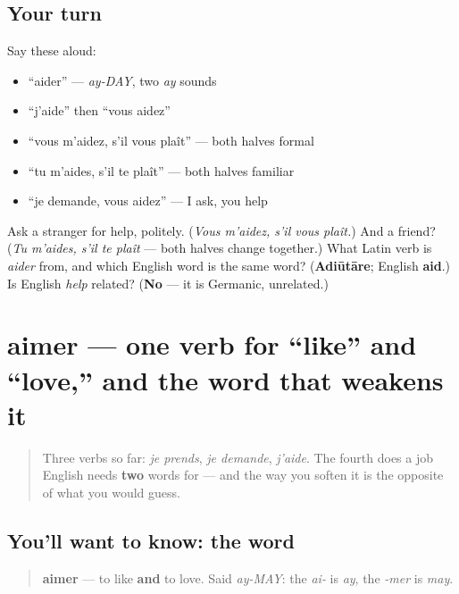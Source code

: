 \subsection*{Your turn}
Say these aloud:

\begin{itemize}
\raggedright
  \item \textquotedblleft{}aider\textquotedblright{} — \emph{ay-DAY}, two \emph{ay} sounds
  \item \textquotedblleft{}j'aide\textquotedblright{} then \textquotedblleft{}vous aidez\textquotedblright{}
  \item \textquotedblleft{}vous m'aidez, s'il vous plaît\textquotedblright{} — both halves formal
  \item \textquotedblleft{}tu m'aides, s'il te plaît\textquotedblright{} — both halves familiar
  \item \textquotedblleft{}je demande, vous aidez\textquotedblright{} — I ask, you help
\end{itemize}

\begin{tcolorbox}[breakable,colback=teal!4,colframe=teal!35!black,title={Before you move on}]
Ask a stranger for help, politely. (\emph{Vous m'aidez, s'il vous plaît.}) And a friend? (\emph{Tu m'aides, s'il te plaît} — both halves change together.) What Latin verb is \emph{aider} from, and which English word is the same word? (\textbf{Adiūtāre}; English \textbf{aid}.) Is English \emph{help} related? (\textbf{No} — it is Germanic, unrelated.)
\end{tcolorbox}
\section[aimer]{aimer — one verb for \textquotedblleft{}like\textquotedblright{} and \textquotedblleft{}love,\textquotedblright{} and the word that weakens it}

\label{lesson:FR-C24-aimer}



\begin{quote}
Three verbs so far: \emph{je prends}, \emph{je demande}, \emph{j'aide}. The fourth does a job English needs \textbf{two} words for — and the way you soften it is the opposite of what you would guess.
\end{quote}

\subsection*{You'll want to know: the word}
\begin{quote}
\textbf{aimer} — to like \textbf{and} to love. Said \emph{ay-MAY}: the \emph{ai-} is \emph{ay}, the \emph{-mer} is \emph{may}.
\end{quote}

